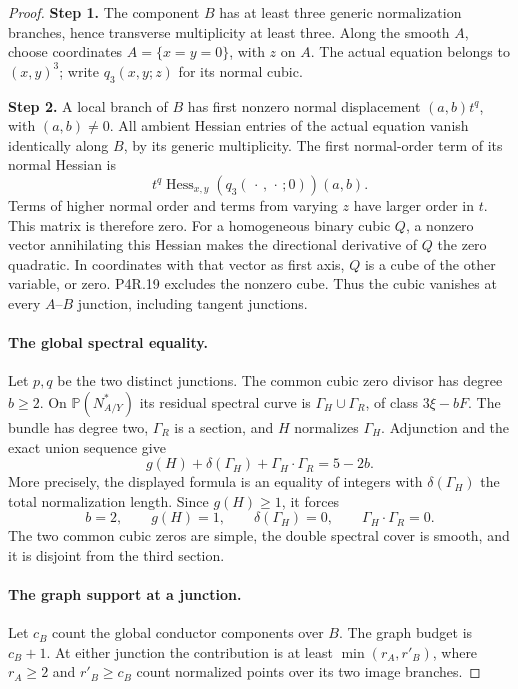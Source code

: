 \begin{proof}
\noindent\textbf{Step 1.} The component $B$ has at least three generic normalization
branches, hence transverse multiplicity at least three.
Along the smooth $A$, choose coordinates $A=\{x=y=0\}$,
with $z$ on $A$. The actual equation belongs to $(x,y)^3$;
write $q_3(x,y;z)$ for its normal cubic.

\noindent\textbf{Step 2.} A local branch of $B$ has first nonzero normal displacement
$(a,b)t^q$, with $(a,b)\ne0$. All ambient Hessian entries
of the actual equation vanish identically along $B$, by
its generic multiplicity. The first normal-order term of
its normal Hessian is
\[
       t^q\operatorname{Hess}_{x,y}
                    (q_3(\,\cdot\,,\,\cdot\,;0))(a,b).
\]
Terms of higher normal order and terms from varying $z$
have larger order in $t$. This matrix is therefore zero.
For a homogeneous binary cubic $Q$, a nonzero vector
annihilating this Hessian makes the directional derivative
of $Q$ the zero quadratic. In coordinates with that vector
as first axis, $Q$ is a cube of the other variable, or zero.
P4R.19 excludes the nonzero cube. Thus the cubic vanishes
at every $A$--$B$ junction, including tangent junctions.

\paragraph{The global spectral equality.}
Let $p,q$ be the two distinct junctions. The common cubic
zero divisor has degree $b\ge2$. On $\mathbb P(N_{A/Y}^*)$
its residual spectral curve is $\Gamma_H\cup\Gamma_R$,
of class $3\xi-bF$. The bundle has degree two, $\Gamma_R$
is a section, and $H$ normalizes $\Gamma_H$. Adjunction
and the exact union sequence give
\[
       g(H)+\delta(\Gamma_H)+\Gamma_H\cdot\Gamma_R=5-2b.
\]
More precisely, the displayed formula is an equality of
integers with $\delta(\Gamma_H)$ the total normalization
length. Since $g(H)\ge1$, it forces
\[
 b=2,\qquad g(H)=1,\qquad \delta(\Gamma_H)=0,
                  \qquad\Gamma_H\cdot\Gamma_R=0.          \tag{4.57a}
\]
The two common cubic zeros are simple, the double spectral
cover is smooth, and it is disjoint from the third section.

\paragraph{The graph support at a junction.}
Let $c_B$ count the global conductor components over $B$.
The graph budget is $c_B+1$. At either junction the
contribution is at least $\min(r_A,r'_B)$, where
$r_A\ge2$ and $r'_B\ge c_B$ count normalized points
over its two image branches.


\end{proof}
